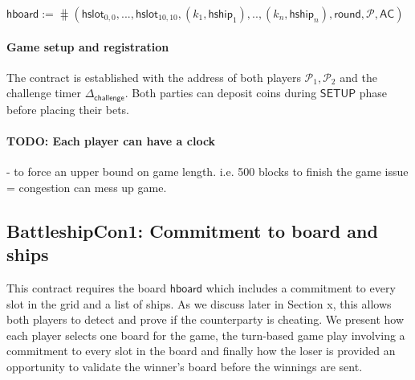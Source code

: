 \documentclass{llncs}
\newcommand{\gamesetup}{\mathsf{SETUP}}
\newcommand{\hboard}{\mathsf{hboard}}
\newcommand{\hslot}{\mathsf{hslot}}
\newcommand{\hship}{\mathsf{hship}}
\newcommand{\participant}{\mathcal{P}}
\newcommand{\appcontract}{\mathsf{AC}}
\newcommand{\timerchallenge}{\mathsf{\Delta}_{\mathsf{challenge}}}
\begin{document}
\begin{center}
$\hboard := \hash(\hslot_{0,0},...,\hslot_{10,10},(k_{1},\hship_{1}),..,(k_{n},\hship_{n}), \mathsf{round}, \participant, \appcontract)$
\end{center}


\paragraph{Game setup and registration} 
The contract is established with the address of both players $\participant_{1},\participant_{2}$ and the challenge timer $\timerchallenge$. 
Both parties can deposit coins during $\gamesetup$ phase before placing their bets. 

\paragraph{TODO: Each player can have a clock} - to force an upper bound on game length. i.e. 500 blocks to finish the game issue = congestion can mess up game. 

\subsection{BattleshipCon1: Commitment to board and ships } 

This contract requires the board $\hboard$ which includes a commitment to every slot in the grid and a list of ships. 
As we discuss later in Section x, this allows both players to detect and prove if the counterparty is cheating.  
We present how each player selects one board for the game, the turn-based game play involving a commitment to every slot in the board and finally how the loser is provided an opportunity to validate the winner's board before the winnings are sent. 
\end{document}
